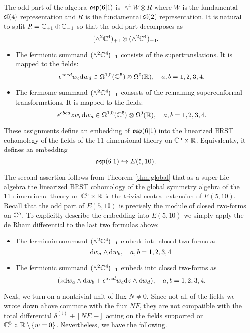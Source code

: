 The odd part of the algebra $\mathfrak{osp}(6|1)$ is $\wedge^4 W \otimes R$ where $W$ is the fundamental $\mathfrak{sl}(4)$ representation and $R$ is the fundamental $\mathfrak{sl}(2)$ representation. 
It is natural to split $R = \mathbb C_{+1} \oplus \mathbb C_{-1}$ so that the odd part decomposes as
\[
(\wedge^2 \mathbb C^4)_{+1} \otimes (\wedge^2 \mathbb C^4)_{-1} .
\]

\begin{itemize}
\item 
The fermionic summand $(\wedge^2 \mathbb C^4)_{+1}$ consists of the supertranslations. 
It is mapped to the fields: 
\[
\epsilon^{abcd} w_c {\rm d} w_d \in \Omega^{1,0}(\mathbb C^5) \otimes \Omega^0(\mathbb R) , \quad a,b=1,2,3,4. 
\] 
\item The fermionic summand $(\wedge^2 \mathbb C^4)_{-1}$ consists of the remaining superconformal transformations. 
It is mapped to the fields: 
\[
\epsilon^{abcd} z w_c {\rm d} w_d \in \Omega^{1,0}(\mathbb C^5) \otimes \Omega^0(\mathbb R) , \quad a,b=1,2,3,4. 
\] 
\end{itemize}


\begin{lem}
These assignments define an embedding of $\mathfrak{osp}(6|1)$ into the linearized BRST cohomology of the fields of the 11-dimensional theory on $\mathbb C^5 \times \mathbb R$. 
Equivalently, it defines an embedding
\[
\mathfrak{osp}(6|1) \hookrightarrow E(5,10) .
\]
\end{lem} 

The second assertion follows from Theorem \ref{thm:global} that as a super Lie algebra the linearized BRST cohomology of the global symmetry algebra of the 11-dimensional theory on $\mathbb C^5 \times \mathbb R$ is the trivial central extension of $E(5,10)$. 
Recall that the odd part of $E(5,10)$ is precisely the module of closed two-forms on $\mathbb C^5$. 
To explicitly describe the embedding into $E(5,10)$ we simply apply the de Rham differential to the last two formulas above:
\begin{itemize}
\item 
The fermionic summand $(\wedge^2 \mathbb C^4)_{+1}$ embeds into closed two-forms as
\[
{\rm d} w_a \wedge {\rm d} w_b, \quad a,b=1,2,3,4. 
\] 
\item The fermionic summand $(\wedge^2 \mathbb C^4)_{-1}$ embeds into closed two-forms as
\[
(z {\rm d} w_a  \wedge {\rm d} w_b + \epsilon^{abcd} w_c {\rm d} z \wedge {\rm d} w_d) , \quad a,b=1,2,3,4. 
\] 
\end{itemize}

\parsec[]

Next, we turn on a nontrivial unit of flux $N \ne 0$. 
Since not all of the fields we wrote down above commute with the flux $N F$, they are not compatible with the total differential $\delta^{(1)} + [N F, -]$ acting on the fields supported on $\mathbb C^5 \times \mathbb R \setminus \{w=0\}$. 
Nevertheless, we have the following. 


